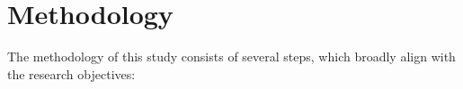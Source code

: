 \section{Methodology}
\label{sec:methodology}
The methodology of this study consists of several steps, which broadly align with the research objectives:


\item 

\item 

\item 

\item 


